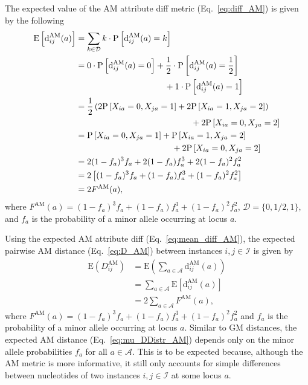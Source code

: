 \documentclass[aos]{imsart}
\begin{document}
The expected value of the AM attribute diff metric (Eq.~\ref{eq:diff_AM}) is given by the following
%
\begin{equation}\label{eq:mean_diff_AM}
\begin{aligned}
\text{E}\left[\text{d}^\text{AM}_{ij}(a)\right] &= \sum_{k \in \mathcal{D}} k \cdot \text{P}\left[\text{d}^\text{AM}_{ij}(a) = k\right] \\
&= 0 \cdot \text{P}\left[\text{d}^\text{AM}_{ij}(a) = 0\right] + \frac{1}{2} \cdot \text{P}\left[\text{d}^\text{AM}_{ij}(a) = \frac{1}{2}\right] \\
&\hspace{3.7cm}+ 1 \cdot \text{P}\left[\text{d}^\text{AM}_{ij}(a) = 1\right] \\
&= \frac{1}{2}\left(2 \text{P}\left[X_{ia} = 0, X_{ja} = 1\right] + 2 \text{P}\left[X_{ia} = 1, X_{ja} = 2\right]\right) \\
&\hspace{4.8cm}+ 2 \text{P}\left[X_{ia} = 0, X_{ja} = 2\right] \\
&= \text{P}\left[X_{ia} = 0, X_{ja} = 1\right] + \text{P}\left[X_{ia} = 1, X_{ja} = 2\right] \\
&\hspace{4cm}+ 2 \text{P}\left[X_{ia} = 0, X_{ja} = 2\right] \\
&= 2(1 - f_a)^3f_a + 2(1 - f_a)f^3_a + 2(1 - f_a)^2 f^2_a \\
&= 2\left[(1 - f_a)^3f_a + (1 - f_a)f^3_a + (1 - f_a)^2 f^2_a\right] \\
&= 2F^\text{AM}(a),
\end{aligned}
\end{equation}
%
where $F^\text{AM}(a) = (1 - f_a)^3f_a + (1 - f_a)f^3_a + (1 - f_a)^2 f^2_a$, $\mathcal{D} = \{0,1/2,1\}$, and $f_a$ is the probability of a minor allele occurring at locus $a$.

Using the expected AM attribute diff (Eq.~\ref{eq:mean_diff_AM}), the expected pairwise AM distance (Eq.~\ref{eq:D_AM}) between instances $i,j \in \mathcal{I}$ is given by
%
\begin{equation}\label{eq:mu_DDistr_AM}
\begin{aligned}
\text{E}\left(D^\text{AM}_{ij}\right) &= \text{E}\left(\sum_{a \in \mathcal{A}} \text{d}^\text{AM}_{ij}(a)\right) \\
&= \sum_{a \in \mathcal{A}} \text{E}\left[\text{d}^\text{AM}_{ij}(a)\right] \\
&= 2 \sum_{a \in \mathcal{A}} F^\text{AM}(a),
\end{aligned}
\end{equation}
%
where $F^\text{AM}(a) = (1 - f_a)^3f_a + (1 - f_a)f^3_a + (1 - f_a)^2 f^2_a$ and $f_a$ is the probability of a minor allele occurring at locus $a$. Similar to GM distances, the expected AM distance (Eq.~\ref{eq:mu_DDistr_AM}) depends only on the minor allele probabilities $f_a$ for all $a \in \mathcal{A}$. This is to be expected because, although the AM metric is more informative, it still only accounts for simple differences between nucleotides of two instances $i,j \in \mathcal{I}$ at some locus $a$.
\end{document}
